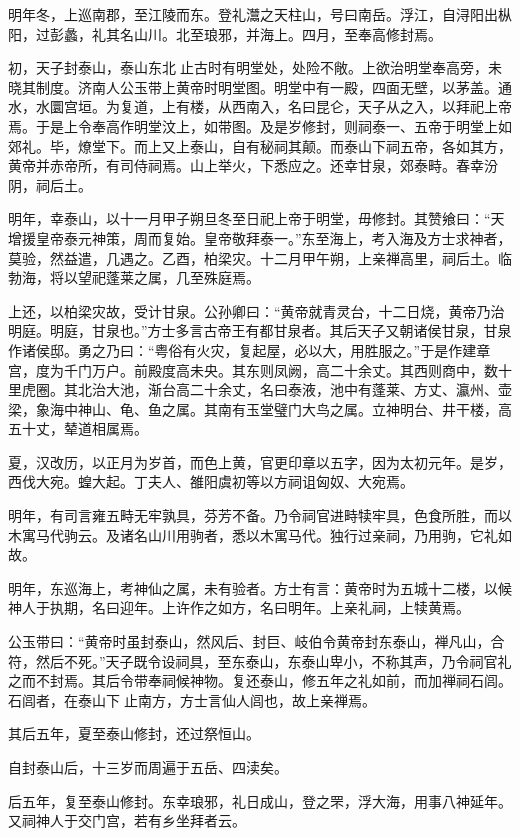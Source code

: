 \documentclass[]{article}
\begin{document}
明年冬，上巡南郡，至江陵而东。登礼灊之天柱山，号曰南岳。浮江，自浔阳出枞阳，过彭蠡，礼其名山川。北至琅邪，并海上。四月，至奉高修封焉。

初，天子封泰山，泰山东北止古时有明堂处，处险不敞。上欲治明堂奉高旁，未晓其制度。济南人公玉带上黄帝时明堂图。明堂中有一殿，四面无壁，以茅盖。通水，水圜宫垣。为复道，上有楼，从西南入，名曰昆仑，天子从之入，以拜祀上帝焉。于是上令奉高作明堂汶上，如带图。及是岁修封，则祠泰一、五帝于明堂上如郊礼。毕，燎堂下。而上又上泰山，自有秘祠其颠。而泰山下祠五帝，各如其方，黄帝并赤帝所，有司侍祠焉。山上举火，下悉应之。还幸甘泉，郊泰畤。春幸汾阴，祠后土。

明年，幸泰山，以十一月甲子朔旦冬至日祀上帝于明堂，毋修封。其赞飨曰：``天增援皇帝泰元神策，周而复始。皇帝敬拜泰一。''东至海上，考入海及方士求神者，莫验，然益遣，几遇之。乙酉，柏梁灾。十二月甲午朔，上亲禅高里，祠后土。临勃海，将以望祀蓬莱之属，几至殊庭焉。

上还，以柏梁灾故，受计甘泉。公孙卿曰：``黄帝就青灵台，十二日烧，黄帝乃治明庭。明庭，甘泉也。''方士多言古帝王有都甘泉者。其后天子又朝诸侯甘泉，甘泉作诸侯邸。勇之乃曰：``粤俗有火灾，复起屋，必以大，用胜服之。''于是作建章宫，度为千门万户。前殿度高未央。其东则凤阙，高二十余丈。其西则商中，数十里虎圈。其北治大池，渐台高二十余丈，名曰泰液，池中有蓬莱、方丈、瀛州、壶梁，象海中神山、龟、鱼之属。其南有玉堂璧门大鸟之属。立神明台、井干楼，高五十丈，辇道相属焉。

夏，汉改历，以正月为岁首，而色上黄，官更印章以五字，因为太初元年。是岁，西伐大宛。蝗大起。丁夫人、雒阳虞初等以方祠诅匈奴、大宛焉。

明年，有司言雍五畤无牢孰具，芬芳不备。乃令祠官进畤犊牢具，色食所胜，而以木寓马代驹云。及诸名山川用驹者，悉以木寓马代。独行过亲祠，乃用驹，它礼如故。

明年，东巡海上，考神仙之属，未有验者。方士有言：黄帝时为五城十二楼，以候神人于执期，名曰迎年。上许作之如方，名曰明年。上亲礼祠，上犊黄焉。

公玉带曰：``黄帝时虽封泰山，然风后、封巨、岐伯令黄帝封东泰山，禅凡山，合符，然后不死。''天子既令设祠具，至东泰山，东泰山卑小，不称其声，乃令祠官礼之而不封焉。其后令带奉祠候神物。复还泰山，修五年之礼如前，而加禅祠石闾。石闾者，在泰山下止南方，方士言仙人闾也，故上亲禅焉。

其后五年，夏至泰山修封，还过祭恒山。

自封泰山后，十三岁而周遍于五岳、四渎矣。

后五年，复至泰山修封。东幸琅邪，礼日成山，登之罘，浮大海，用事八神延年。又祠神人于交门宫，若有乡坐拜者云。
\end{document}
